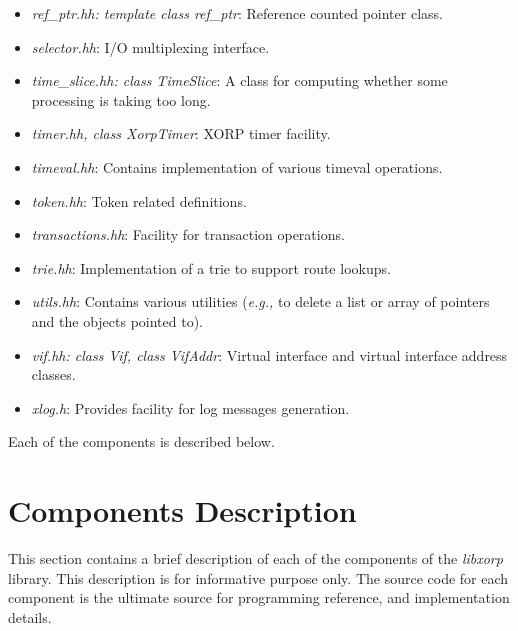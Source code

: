 \documentclass[11pt]{article}
\newcommand{\eg}{\emph{e.g.,}\xspace}
\begin{document}
\begin{itemize}
  \item \emph{ref\_ptr.hh: template class ref\_ptr}: Reference counted
  pointer class.

  \item \emph{selector.hh}: I/O multiplexing interface.

  \item \emph{time\_slice.hh: class TimeSlice}: A class for computing
  whether some processing is taking too long.

  \item \emph{timer.hh, class XorpTimer}: XORP timer facility.

  \item \emph{timeval.hh}: Contains implementation of various timeval
  operations.

  \item \emph{token.hh}: Token related definitions.

  \item \emph{transactions.hh}: Facility for transaction operations.

  \item \emph{trie.hh}: Implementation of a trie to support route
  lookups.

  \item \emph{utils.hh}: Contains various utilities (\eg to delete a
  list or array of pointers and the objects pointed to).

  \item \emph{vif.hh: class Vif, class VifAddr}: Virtual interface and
  virtual interface address classes.

  \item \emph{xlog.h}: Provides facility for log messages generation.

\end{itemize}

Each of the components is described below.


\section{Components Description}

This section contains a brief description of each of the components of
the \emph{libxorp} library. This description is for informative
purpose only. The source code for each component is the ultimate source
for programming reference, and implementation details.

\end{document}
